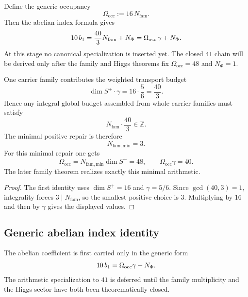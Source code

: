 \begin{remark}
Define the generic occupancy
\[
\Omega_{\mathrm{occ}}:=16\,N_{\mathrm{fam}}.
\]
Then the abelian-index formula gives
\[
10\,b_1
=
\frac{40}{3}N_{\mathrm{fam}}+N_\Phi
=
\Omega_{\mathrm{occ}}\,\gamma+N_\Phi.
\]
At this stage no canonical specialization is inserted yet. The closed $41$ chain will be derived
only after the family and Higgs theorems fix $\Omega_{\mathrm{occ}}=48$ and $N_\Phi=1$.
\end{remark}

\begin{corollary}
\label{cor:family-integrality-repair}
One carrier family contributes the weighted transport budget
\[
\dim S^+\cdot\gamma
=
16\cdot\frac56
=
\frac{40}{3}.
\]
Hence any integral global budget assembled from whole carrier families must satisfy
\[
N_{\mathrm{fam}}\cdot \frac{40}{3}\in\mathbb Z.
\]
The minimal positive repair is therefore
\[
N_{\mathrm{fam,min}}=3.
\]
For this minimal repair one gets
\[
\Omega_{\mathrm{occ}}=N_{\mathrm{fam,min}}\dim S^+=48,
\qquad
\Omega_{\mathrm{occ}}\gamma=40.
\]
The later family theorem realizes exactly this minimal arithmetic.
\end{corollary}

\begin{proof}
The first identity uses $\dim S^+=16$ and $\gamma=5/6$. Since $\gcd(40,3)=1$, integrality forces
$3\mid N_{\mathrm{fam}}$, so the smallest positive choice is $3$. Multiplying by $16$ and then by
$\gamma$ gives the displayed values.
\end{proof}

\subsection{Generic abelian index identity}

The abelian coefficient is first carried only in the generic form
\begin{equation}
\label{eq:41-chain-main}
10\,b_1
=
\Omega_{\mathrm{occ}}\gamma+N_\Phi.
\end{equation}
The arithmetic specialization to $41$ is deferred until the family multiplicity and the Higgs
sector have both been theorematically closed.

